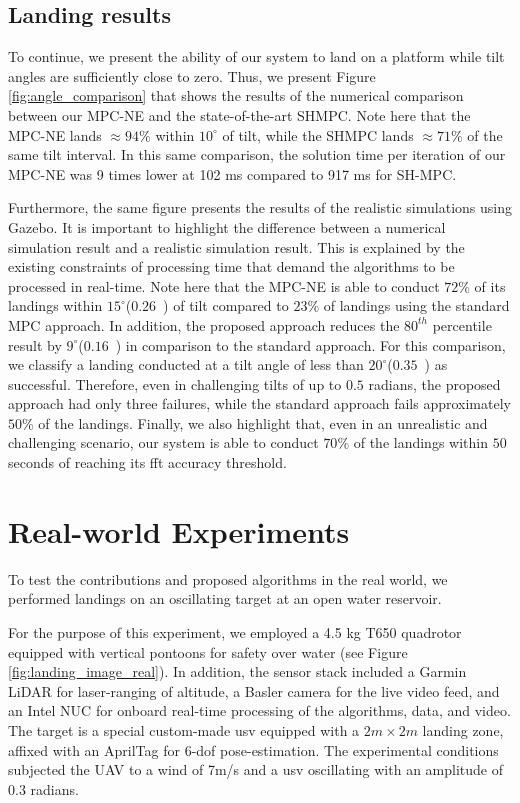\documentclass[letterpaper, 10 pt, journal, twoside]{IEEEtran}
\begin{document}
\subsection{Landing results}
To continue, we present the ability of our system to land on a platform while tilt angles are sufficiently close to zero. Thus, we present Figure \ref{fig:angle_comparison} that shows the results of the numerical comparison between our MPC-NE and the state-of-the-art SHMPC. Note here that the MPC-NE lands $\approx94\%$ within $10^\circ$ of tilt, while the SHMPC lands $\approx71\%$ of the same tilt interval. In this same comparison, the solution time per iteration of our MPC-NE was 9 times lower at 102 ms compared to 917 ms for SH-MPC. 

Furthermore, the same figure presents the results of the realistic simulations using Gazebo. It is important to highlight the difference between a numerical simulation result and a realistic simulation result. This is explained by the existing constraints of processing time that demand the algorithms to be processed in real-time. Note here that the MPC-NE is able to conduct $72\%$ of its landings within $15^{\circ}$($0.26$~) of tilt compared to $23\%$ of landings using the standard MPC approach. In addition, the proposed approach reduces the $80^{th}$ percentile result by $9^{\circ}$($0.16$~) in comparison to the standard approach. For this comparison, we classify a landing conducted at a tilt angle of less than $20^{\circ}$($0.35$~) as successful. Therefore, even in challenging tilts of up to $0.5$ radians, the proposed approach had only three failures, while the standard approach fails approximately $50\%$ of the landings. Finally, we also highlight that, even in an unrealistic and challenging scenario, our system is able to conduct $70\%$ of the landings within $50$ seconds of reaching its \ac{fft} accuracy threshold.



\section{Real-world Experiments}

To test the contributions and proposed algorithms in the real world, we performed landings on an oscillating target at an open water reservoir. 

For the purpose of this experiment, we employed a 4.5 kg T650 quadrotor equipped with vertical pontoons\cite{9836083} for safety over water (see Figure \ref{fig:landing_image_real}). In addition, the sensor stack included a Garmin LiDAR for laser-ranging of altitude, a Basler camera for the live video feed, and an Intel NUC for onboard real-time processing of the algorithms, data, and video. The target is a special custom-made \ac{usv}\cite{9775538} equipped with a $2 m \times 2 m$ landing zone, affixed with an AprilTag\cite{krogius2019iros} for 6-\ac{dof} pose-estimation. The experimental conditions subjected the UAV to a wind of 7m/s and a \ac{usv} oscillating with an amplitude of $0.3$ radians.
\end{document}
